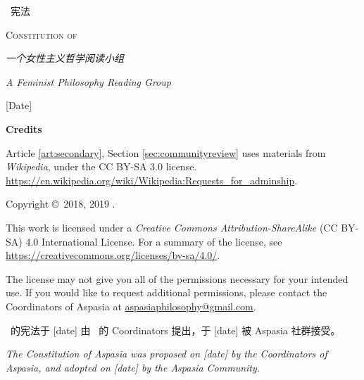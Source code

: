 \begin{titlepage}
		\begin{center}
		\vspace*{7em}
		{\scshape\LARGE \name\ 宪法 \par}
		\vspace{1.25em}
		{\scshape\Large Constitution of \name \par}
		\vspace{6.5em}
		{\large\itshape 一个女性主义哲学阅读小组\par}
		\vspace{1em}
		{\large\itshape A Feminist Philosophy Reading Group\par}
		\vfill
		{\large[Date]\par}
		\vspace{1em}
		\end{center}
		
		\newpage %
		\thispagestyle{empty}
		\setlength{\parindent}{0pt}
		
		\textbf{Credits}\par
		\vspace{1em}
		Article \ref{art:secondary}, Section \ref{sec:communityreview} uses materials from \textit{Wikipedia}, under the CC BY-SA 3.0 license.
		\url{https://en.wikipedia.org/wiki/Wikipedia:Requests_for_adminship}.
		~\vfill

		Copyright \copyright\ 2018, 2019 \name.\par
		\vspace{1em}
		This work is licensed under a \textit{Creative Commons Attribution-ShareAlike} (CC BY-SA) 4.0 International License. For a summary of the license, see \url{https://creativecommons.org/licenses/by-sa/4.0/}.\par
		\vspace{1em}
		The license may not give you all of the permissions necessary for your intended use. If you would like to request additional permissions, please contact the Coordinators of Aspasia at \href{mailto:aspasiaphilosophy@gmail.com}
		{\ttfamily aspasiaphilosophy@gmail.com}.
	\end{titlepage}

	\newpage
	\vspace*{6em}
	\thispagestyle{empty}
	
	\name\ 的宪法于 [date] 由 \name\ 的 Coordinators 提出，于 [date] 被 Aspasia 社群接受。
	
	\vspace{2em}
	
	\textit{The Constitution of Aspasia was proposed on [date] by the Coordinators of Aspasia, and adopted on [date] by the Aspasia Community.}